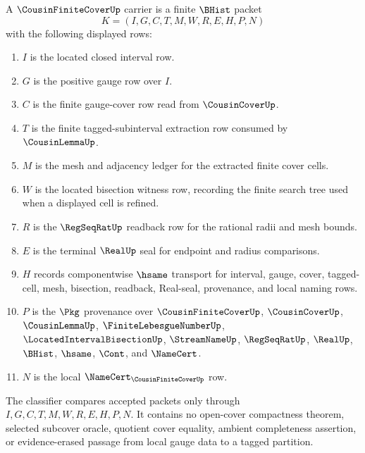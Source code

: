 \begin{definition}
\label{def:cousin-finite-cover-carrier}
A $\CousinFiniteCoverUp$ carrier is a finite $\BHist$ packet
$$
K=(I,G,C,T,M,W,R,E,H,P,N)
$$
with the following displayed rows:
\begin{enumerate}
\item $I$ is the located closed interval row.
\item $G$ is the positive gauge row over $I$.
\item $C$ is the finite gauge-cover row read from $\CousinCoverUp$.
\item $T$ is the finite tagged-subinterval extraction row consumed by $\CousinLemmaUp$.
\item $M$ is the mesh and adjacency ledger for the extracted finite cover cells.
\item $W$ is the located bisection witness row, recording the finite search tree used when a displayed cell is refined.
\item $R$ is the $\RegSeqRatUp$ readback row for the rational radii and mesh bounds.
\item $E$ is the terminal $\RealUp$ seal for endpoint and radius comparisons.
\item $H$ records componentwise $\hsame$ transport for interval, gauge, cover, tagged-cell, mesh, bisection, readback, Real-seal, provenance, and local naming rows.
\item $P$ is the $\Pkg$ provenance over $\CousinFiniteCoverUp$, $\CousinCoverUp$, $\CousinLemmaUp$, $\FiniteLebesgueNumberUp$, $\LocatedIntervalBisectionUp$, $\StreamNameUp$, $\RegSeqRatUp$, $\RealUp$, $\BHist$, $\hsame$, $\Cont$, and $\NameCert$.
\item $N$ is the local $\NameCert_{\CousinFiniteCoverUp}$ row.
\end{enumerate}
The classifier compares accepted packets only through $I,G,C,T,M,W,R,E,H,P,N$. It contains no open-cover compactness theorem, selected subcover oracle, quotient cover equality, ambient completeness assertion, or evidence-erased passage from local gauge data to a tagged partition.
\end{definition}

